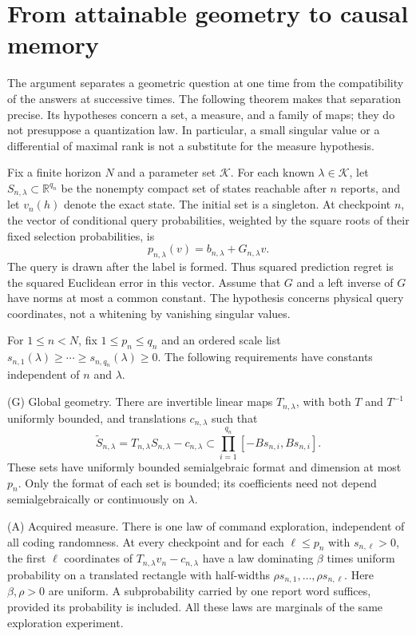 \documentclass[11pt]{amsart}
\theoremstyle{definition}\newtheorem{definition}[theorem]{Definition}
\theoremstyle{remark}\newtheorem{remark}[theorem]{Remark}
\newcommand{\R}{\mathbb R}\newcommand{\N}{\mathbb N}\newcommand{\C}{\mathbb C}
\begin{document}
\section{From attainable geometry to causal memory}
\label{sec:causal-transfer}
The argument separates a geometric question at one time from the
compatibility of the answers at successive times. The following theorem
makes that separation precise. Its hypotheses concern a set, a measure,
and a family of maps; they do not presuppose a quantization law. In
particular, a small singular value or a differential of maximal rank is
not a substitute for the measure hypothesis.

Fix a finite horizon $N$ and a parameter set $\mathcal K$. For each
known $\lambda\in\mathcal K$, let $S_{n,\lambda}\subset\R^{q_n}$ be
the nonempty compact set of states reachable after $n$ reports, and let
$v_n(h)$ denote the exact state. The initial set is a singleton. At
checkpoint $n$, the vector of conditional query probabilities, weighted
by the square roots of their fixed selection probabilities, is
\[
 p_{n,\lambda}(v)=b_{n,\lambda}+G_{n,\lambda}v.
\]
The query is drawn after the label is formed. Thus squared prediction
regret is the squared Euclidean error in this vector. Assume that $G$
and a left inverse of $G$ have norms at most a common constant. The
hypothesis concerns physical query coordinates, not a whitening by
vanishing singular values.

For $1\le n<N$, fix $1\le p_n\le q_n$ and an ordered scale list
$s_{n,1}(\lambda)\ge\cdots\ge s_{n,q_n}(\lambda)\ge0$. The
following requirements have constants independent of $n$ and $\lambda$.

\smallskip\noindent\textup{(G) Global geometry.}
There are invertible linear maps $T_{n,\lambda}$, with both $T$ and
$T^{-1}$ uniformly bounded, and translations $c_{n,\lambda}$ such that
\[
 \widetilde S_{n,\lambda}=T_{n,\lambda}S_{n,\lambda}-c_{n,\lambda}
 \subset\prod_{i=1}^{q_n}[-B s_{n,i},B s_{n,i}].
\]
These sets have uniformly bounded semialgebraic format and dimension
at most $p_n$. Only the format of each set is bounded; its coefficients
need not depend semialgebraically or continuously on $\lambda$.

\smallskip\noindent\textup{(A) Acquired measure.}
There is one law of command exploration, independent of all coding
randomness. At every checkpoint and for each $\ell\le p_n$ with
$s_{n,\ell}>0$, the first $\ell$ coordinates of
$T_{n,\lambda}v_n-c_{n,\lambda}$ have a law dominating $\beta$
times uniform probability on a translated rectangle with half-widths
$\rho s_{n,1},\ldots,\rho s_{n,\ell}$. Here $\beta,\rho>0$ are
uniform. A subprobability carried by one report word suffices, provided
its probability is included. All these laws are marginals of the same
exploration experiment.
\end{document}
